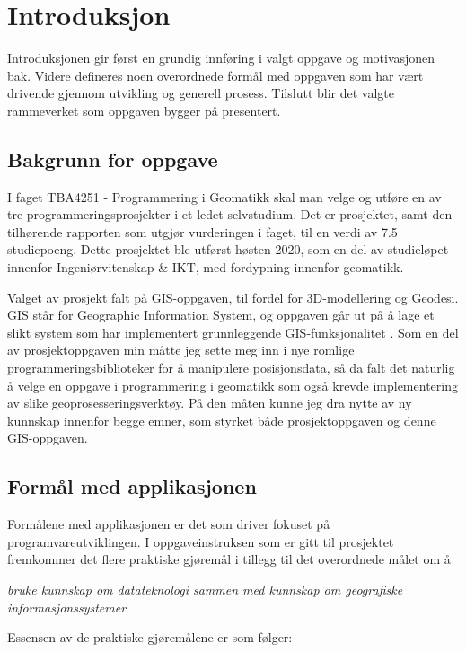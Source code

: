\chapter{Introduksjon}
Introduksjonen gir først en grundig innføring i valgt oppgave og motivasjonen bak. Videre defineres noen overordnede formål med oppgaven som har vært drivende gjennom utvikling og generell prosess. Tilslutt blir det valgte rammeverket som oppgaven bygger på presentert.

\section{Bakgrunn for oppgave}
I faget TBA4251 - Programmering i Geomatikk skal man velge og utføre en av tre programmeringsprosjekter i et ledet selvstudium. Det er prosjektet, samt den tilhørende rapporten som utgjør vurderingen i faget, til en verdi av 7.5 studiepoeng. Dette prosjektet ble utførst høsten 2020, som en del av studieløpet innenfor Ingeniørvitenskap \& IKT, med fordypning innenfor geomatikk. 

Valget av prosjekt falt på GIS-oppgaven, til fordel for 3D-modellering og Geodesi. GIS står for Geographic Information System, og oppgaven går ut på å lage et slikt system som har implementert grunnleggende GIS-funksjonalitet \cite{midtbøa}. Som en del av prosjektoppgaven min måtte jeg sette meg inn i nye romlige programmeringsbiblioteker for å manipulere posisjonsdata, så da falt det naturlig å velge en oppgave i programmering i geomatikk som også krevde implementering av slike geoprosesseringsverktøy. På den måten kunne jeg dra nytte av ny kunnskap innenfor begge emner, som styrket både prosjektoppgaven og denne GIS-oppgaven. 

\section{Formål med applikasjonen}

Formålene med applikasjonen er det som driver fokuset på programvareutviklingen. I oppgaveinstruksen som er gitt til prosjektet \cite{midtbøa} fremkommer det flere praktiske gjøremål i tillegg til det overordnede målet om å 

\begin{displayquote}
    \textit{bruke kunnskap om datateknologi sammen med kunnskap om geografiske informasjonssystemer}
    \end{displayquote}
Essensen av de praktiske gjøremålene er som følger: 

